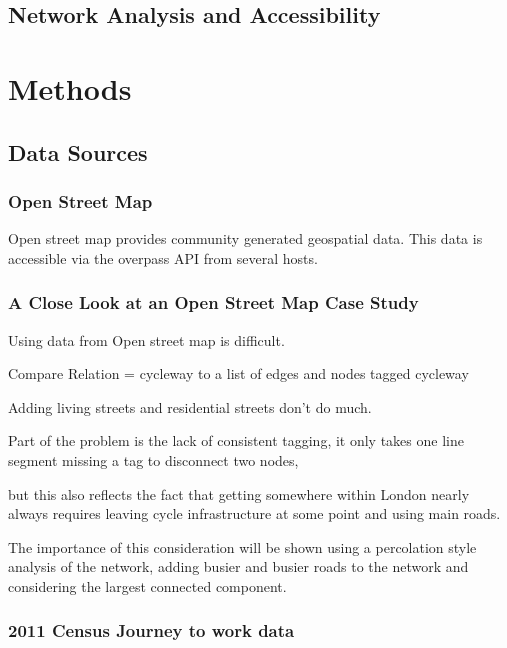 \documentclass[11pt]{article} %
\begin{document}
\subsection{Network Analysis and Accessibility}

\section{Methods}

\subsection{Data Sources}

\subsubsection{Open Street Map}

Open street map provides community generated geospatial data. This data is accessible via the overpass API from several hosts. 

\subsubsection{A Close Look at an Open Street Map Case Study}

Using data from Open street map is difficult. 

Compare Relation = cycleway to a list of edges and nodes tagged cycleway

Adding living streets and residential streets don't do much. 

Part of the problem is the lack of consistent tagging, it only takes one line segment missing a tag to disconnect two nodes,

but this also reflects the fact that getting somewhere within London nearly always requires leaving cycle infrastructure at some point and using main roads. 

The importance of this consideration will be shown using a percolation style analysis of the network, adding busier and busier roads to the network and considering the largest connected component. 

\subsubsection{2011 Census Journey to work data}
\end{document}
